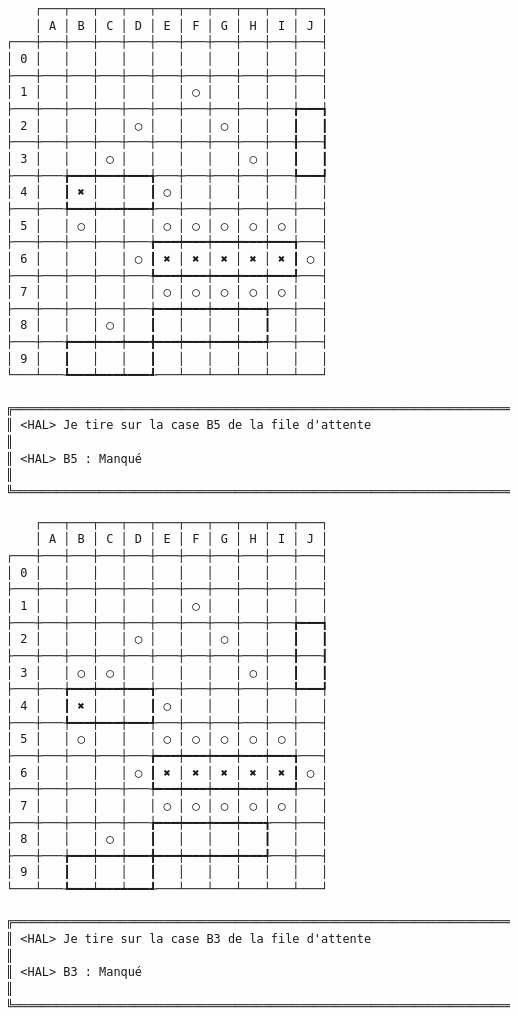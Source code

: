 {\scriptsize
\begin{verbatim}
    ┌───┬───┬───┬───┬───┬───┬───┬───┬───┬───┐
    │ A │ B │ C │ D │ E │ F │ G │ H │ I │ J │
┌───┼───┼───┼───┼───┼───┼───┼───┼───┼───┼───┤
│ 0 │   │   │   │   │   │   │   │   │   │   │
├───┼───┼───┼───┼───┼───┼───┼───┼───┼───┼───┤
│ 1 │   │   │   │   │   │ ◯ │   │   │   │   │
├───┼───┼───┼───┼───┼───┼───┼───┼───┼───╆━━━┪
│ 2 │   │   │   │ ◯ │   │   │ ◯ │   │   ┃   ┃
├───┼───┼───┼───┼───┼───┼───┼───┼───┼───╂───┨
│ 3 │   │   │ ◯ │   │   │   │   │ ◯ │   ┃   ┃
├───┼───╆━━━┿━━━┿━━━╅───┼───┼───┼───┼───╄━━━┩
│ 4 │   ┃ ✖ │   │   ┃ ◯ │   │   │   │   │   │
├───┼───╄━━━┿━━━┿━━━╃───┼───┼───┼───┼───┼───┤
│ 5 │   │ ◯ │   │   │ ◯ │ ◯ │ ◯ │ ◯ │ ◯ │   │
├───┼───┼───┼───┼───╆━━━┿━━━┿━━━┿━━━┿━━━╅───┤
│ 6 │   │   │   │ ◯ ┃ ✖ │ ✖ │ ✖ │ ✖ │ ✖ ┃ ◯ │
├───┼───┼───┼───┼───╄━━━┿━━━┿━━━┿━━━┿━━━╃───┤
│ 7 │   │   │   │   │ ◯ │ ◯ │ ◯ │ ◯ │ ◯ │   │
├───┼───┼───┼───┼───╆━━━┿━━━┿━━━┿━━━╅───┼───┤
│ 8 │   │   │ ◯ │   ┃   │   │   │   ┃   │   │
├───┼───╆━━━┿━━━┿━━━╋━━━┿━━━┿━━━┿━━━╃───┼───┤
│ 9 │   ┃   │   │   ┃   │   │   │   │   │   │
└───┴───┺━━━┷━━━┷━━━┹───┴───┴───┴───┴───┴───┘

╔══════════════════════════════════════════════════════════════════════════════════════════════════╗
║ <HAL> Je tire sur la case B5 de la file d'attente                                                ║
║ <HAL> B5 : Manqué                                                                                ║
╚══════════════════════════════════════════════════════════════════════════════════════════════════╝
\end{verbatim}}
\newpage

{\scriptsize
\begin{verbatim}
    ┌───┬───┬───┬───┬───┬───┬───┬───┬───┬───┐
    │ A │ B │ C │ D │ E │ F │ G │ H │ I │ J │
┌───┼───┼───┼───┼───┼───┼───┼───┼───┼───┼───┤
│ 0 │   │   │   │   │   │   │   │   │   │   │
├───┼───┼───┼───┼───┼───┼───┼───┼───┼───┼───┤
│ 1 │   │   │   │   │   │ ◯ │   │   │   │   │
├───┼───┼───┼───┼───┼───┼───┼───┼───┼───╆━━━┪
│ 2 │   │   │   │ ◯ │   │   │ ◯ │   │   ┃   ┃
├───┼───┼───┼───┼───┼───┼───┼───┼───┼───╂───┨
│ 3 │   │ ◯ │ ◯ │   │   │   │   │ ◯ │   ┃   ┃
├───┼───╆━━━┿━━━┿━━━╅───┼───┼───┼───┼───╄━━━┩
│ 4 │   ┃ ✖ │   │   ┃ ◯ │   │   │   │   │   │
├───┼───╄━━━┿━━━┿━━━╃───┼───┼───┼───┼───┼───┤
│ 5 │   │ ◯ │   │   │ ◯ │ ◯ │ ◯ │ ◯ │ ◯ │   │
├───┼───┼───┼───┼───╆━━━┿━━━┿━━━┿━━━┿━━━╅───┤
│ 6 │   │   │   │ ◯ ┃ ✖ │ ✖ │ ✖ │ ✖ │ ✖ ┃ ◯ │
├───┼───┼───┼───┼───╄━━━┿━━━┿━━━┿━━━┿━━━╃───┤
│ 7 │   │   │   │   │ ◯ │ ◯ │ ◯ │ ◯ │ ◯ │   │
├───┼───┼───┼───┼───╆━━━┿━━━┿━━━┿━━━╅───┼───┤
│ 8 │   │   │ ◯ │   ┃   │   │   │   ┃   │   │
├───┼───╆━━━┿━━━┿━━━╋━━━┿━━━┿━━━┿━━━╃───┼───┤
│ 9 │   ┃   │   │   ┃   │   │   │   │   │   │
└───┴───┺━━━┷━━━┷━━━┹───┴───┴───┴───┴───┴───┘

╔══════════════════════════════════════════════════════════════════════════════════════════════════╗
║ <HAL> Je tire sur la case B3 de la file d'attente                                                ║
║ <HAL> B3 : Manqué                                                                                ║
╚══════════════════════════════════════════════════════════════════════════════════════════════════╝
\end{verbatim}}
\newpage

